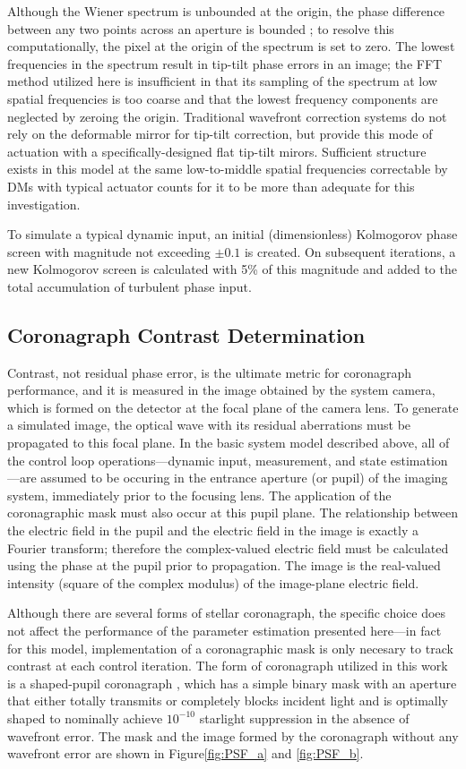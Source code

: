 \documentclass[11pt,reqno]{amsart}
\begin{document}
Although the Wiener spectrum is unbounded at the origin, the phase difference between any two points across an aperture is bounded \cite{Lane1992}; to resolve this computationally, the pixel at the origin of the spectrum is set to zero.  The lowest frequencies in the spectrum result in tip-tilt phase errors in an image; the FFT method utilized here is insufficient in that its sampling of the spectrum at low spatial frequencies is too coarse and that the lowest frequency components are neglected by zeroing the origin.  Traditional wavefront correction systems do not rely on the deformable mirror for tip-tilt correction, but provide this mode of actuation with a specifically-designed flat tip-tilt mirors.  Sufficient structure exists in this model at the same low-to-middle spatial frequencies correctable by DMs with typical actuator counts for it to be more than adequate for this investigation.

To simulate a typical dynamic input, an initial (dimensionless) Kolmogorov phase screen with magnitude not exceeding $\pm0.1$ is created.  On subsequent iterations, a new Kolmogorov screen is calculated with 5\% of this magnitude and added to the total accumulation of turbulent phase input.

\subsection{Coronagraph Contrast Determination}
Contrast, not residual phase error, is the ultimate metric for coronagraph performance, and it is measured in the image obtained by the system camera, which is formed on the detector at the focal plane of the camera lens.  To generate a simulated image, the optical wave with its residual aberrations must be propagated to this focal plane.  In the basic system model described above, all of the control loop operations---dynamic input, measurement, and state estimation---are assumed to be occuring in the entrance aperture (or pupil) of the imaging system, immediately prior to the focusing lens.  The application of the coronagraphic mask must also occur at this pupil plane.  The relationship between the electric field in the pupil and the electric field in the image is exactly a Fourier transform; therefore the complex-valued electric field must be calculated using the phase at the pupil prior to propagation.  The image is the real-valued intensity (square of the complex modulus) of the image-plane electric field.

Although there are several forms of stellar coronagraph, the specific choice does not affect the performance of the parameter estimation presented here---in fact for this model, implementation of a coronagraphic mask is only necesary to track contrast at each control iteration.  The form of coronagraph utilized in this work is a shaped-pupil coronagraph \cite{Kasdin2003, Carlotti2011, Kasdin2011}, which has a simple binary mask with an aperture that either totally transmits or completely blocks incident light and is optimally shaped to nominally achieve $10^{-10}$ starlight suppression in the absence of wavefront error.  The mask and the image formed by the coronagraph without any wavefront error are shown in Figure\:\ref{fig:PSF_a} and \ref{fig:PSF_b}.
\end{document}
